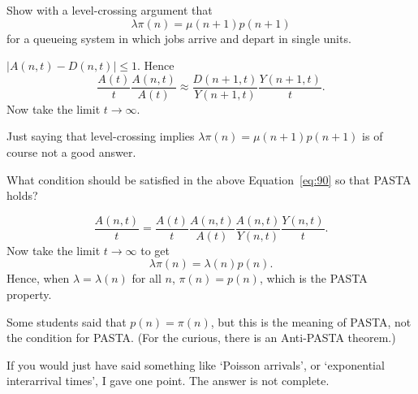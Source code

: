 \begin{exercise}[201704]{2} Show with a level-crossing argument that
  \begin{equation}\label{eq:90}
  \lambda \pi(n) = \mu(n+1) p(n+1)
  \end{equation}
  for a queueing system in which jobs arrive and depart in single
  units.
\begin{solution}
    $|A(n,t)-D(n,t)| \leq 1$. Hence
    \begin{equation*}
      \frac{A(t)}{t} \frac{A(n,t)}{A(t)} \approx 
      \frac{D(n+1, t)}{Y(n+1,t)} \frac{Y(n+1,t)}{t}.
    \end{equation*}
Now take the limit $t\to \infty$.

Just saying that level-crossing implies $\lambda \pi(n) = \mu(n+1)p(n+1)$ is of course not a good answer. 
\end{solution}
\end{exercise}

\begin{exercise}[201704]{2}
  What condition should be satisfied in the above Equation~\eqref{eq:90} so that PASTA holds? 
\begin{solution}
    \begin{equation*}
\frac{A(n,t)}t =  \frac{A(t)}{t} \frac{A(n,t)}{A(t)}   \frac{A(n, t)}{Y(n,t)} \frac{Y(n,t)}{t}.
    \end{equation*}
Now take the limit $t\to \infty$ to get
    \begin{equation*}
\lambda \pi(n) = \lambda(n)p(n).
    \end{equation*}
Hence, when $\lambda=\lambda(n)$ for all $n$, $\pi(n)=p(n)$, which is the PASTA property.


Some students said that $p(n)=\pi(n)$, but this is the meaning of PASTA, not the condition for PASTA. (For the curious, there is an Anti-PASTA theorem.)  

If you would just have said something like `Poisson arrivals', or `exponential interarrival times', I gave one point. The answer is not complete. 
\end{solution}
\end{exercise}

